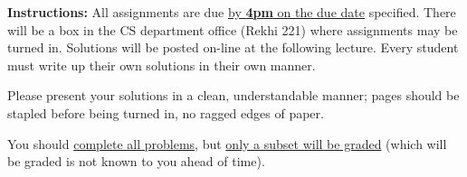 
\extrawidth{0.5in} \extrafootheight{-0in} \pagestyle{headandfoot}
\headrule {} \footrule {}

\ifprintanswers
\else
\noindent \textbf{Instructions:} All assignments are due \underline{by \textbf{4pm} on the due date} specified.  There will be a box in the CS department office (Rekhi 221) where assignments may be turned in.  Solutions will be posted on-line at the following lecture.  Every student
must write up their own solutions in their own manner.

\medskip
\noindent Please present your solutions in a clean, understandable
manner; pages should be stapled before being turned in, no ragged edges of
paper.


\medskip
\noindent You should \underline{complete all problems}, but \underline{only a subset will be graded} (which will be graded is not known to you ahead of time). 
\fi

